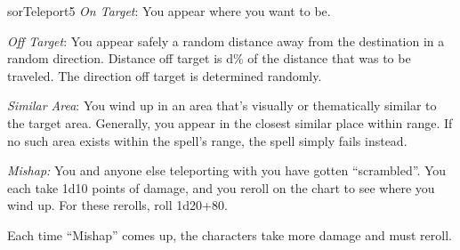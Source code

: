 \begin{spellcard}{sor}{Teleport}{5}
  \emph{On Target}: You appear where you want to be.

  \emph{Off Target}: You appear safely a random distance away from the
  destination in a random direction. Distance off target is d\% of the
  distance that was to be traveled. The direction off target is determined
  randomly.

  \emph{Similar Area}: You wind up in an area that's visually or
  the\-ma\-tic\-ally similar to the target area. Generally, you appear in the
  closest similar place within range. If no such area exists within the
  spell's range, the spell simply fails instead.

  \emph{Mishap:} You and anyone else teleporting with you have gotten
  ``scrambled''. You each take 1d10 points of damage, and you reroll on the
  chart to see where you wind up. For these rerolls, roll 1d20+80.

  Each time ``Mishap'' comes up, the characters take more damage and must
  reroll.

\end{spellcard}
